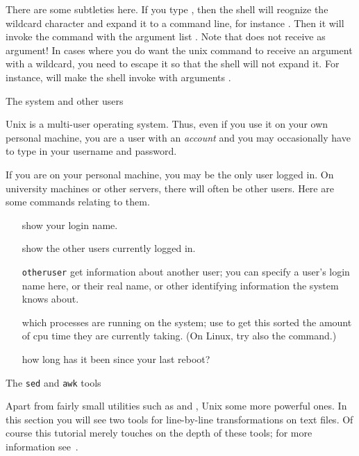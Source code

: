 There are some subtleties here. If you type , then the shell
will reognize the wildcard character and expand it to a command line,
for instance . Then it will invoke the 
command with the argument list . Note that  does
not receive  as argument! In cases where you do want the unix
command to receive an argument with a wildcard, you need to escape it
so that the shell will not expand it. For instance,  will make the shell invoke  with arguments .

 {The system and other users}
\label{sec:users}

Unix is a multi-user operating system. Thus, even if you use it
on your own personal machine, you are a user with an \emph{account}
and you may occasionally
have to type in your username and password.

If you are on your personal machine, you may be the only user logged
in. On university machines or other servers, there will often be other
users. Here are some commands relating to them.

\begin{itemize}
\item [\indextermunix{whoami}] show your login name.
\item [\indextermunix{who}] show the other users currently logged in.
\item [\indextermunix{finger} {\tt otheruser}] get information about another user;
  you can specify a user's login name here, or their real name,
  or other identifying information the system knows about.
\item [\indextermunix{top}] which processes are running on the system; use
   to get this sorted the amount of cpu time they are
  currently taking. (On Linux, try also the  command.)
\item [\indextermunix{uptime}] how long has it been since your last reboot?
\end{itemize}

 {The {\tt sed} and {\tt awk} tools}

Apart from fairly small utilities such as  and , Unix
some more powerful ones. In this section you will see two tools for
line-by-line transformations on text files. Of course this tutorial
merely touches on the depth of these tools; for more information
see~\cite{AWK:awk,OReilly:sedawk}.


